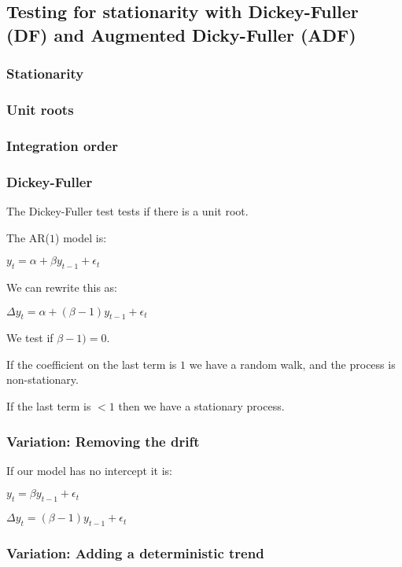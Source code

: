 
\subsection{Testing for stationarity with Dickey-Fuller (DF) and Augmented Dicky-Fuller (ADF)}

\subsubsection{Stationarity}

\subsubsection{Unit roots}


\subsubsection{Integration order}

\subsubsection{Dickey-Fuller}

The Dickey-Fuller test tests if there is a unit root.

The AR(\(1\)) model is:

\(y_t=\alpha + \beta y_{t-1}+\epsilon_t\)

We can rewrite this as:

\(\Delta y_t=\alpha + (\beta -1)y_{t-1}+\epsilon_t\)

We test if \(\beta -1)=0\).

If the coefficient on the last term is \(1\) we have a random walk, and the process is non-stationary.

If the last term is \(<1\) then we have a stationary process.

\subsubsection{Variation: Removing the drift}

If our model has no intercept it is:

\(y_t=\beta y_{t-1}+\epsilon_t\)

\(\Delta y_t=(\beta -1)y_{t-1}+\epsilon_t\)

\subsubsection{Variation: Adding a deterministic trend}

